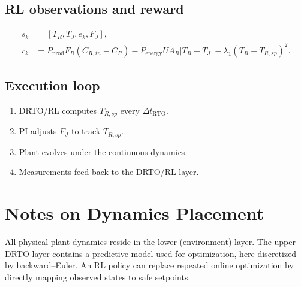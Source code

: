 \documentclass[11pt]{article}
\begin{document}
\subsection{RL observations and reward}
\begin{align}
s_k &= [T_R, T_J, e_k, F_J], \\
r_k &= P_{\mathrm{prod}} F_R (C_{R,in} - C_R) - P_{\mathrm{energy}} U A_R |T_R - T_J| - \lambda_1 (T_R - T_{R,sp})^2.
\end{align}

\subsection{Execution loop}
\begin{enumerate}[label=(\arabic*)]
  \item DRTO/RL computes $T_{R,sp}$ every $\Delta t_{\mathrm{RTO}}$.
  \item PI adjusts $F_J$ to track $T_{R,sp}$.
  \item Plant evolves under the continuous dynamics.
  \item Measurements feed back to the DRTO/RL layer.
\end{enumerate}


\section{Notes on Dynamics Placement}
All physical plant dynamics reside in the lower (environment) layer. The upper DRTO layer contains a predictive model used for optimization, here discretized by backward–Euler. An RL policy can replace repeated online optimization by directly mapping observed states to safe setpoints.
\end{document}
